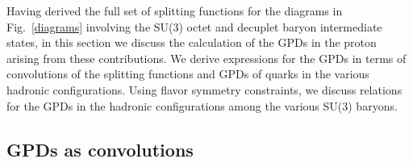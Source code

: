 \documentclass[preprintnumbers,prd,superscriptaddress,preprint]{revtex4-1}
\begin{document}
Having derived the full set of splitting functions for the diagrams in Fig.~\ref{diagrams} involving the SU(3) octet and decuplet baryon intermediate states, in this section we discuss the calculation of the GPDs in the proton arising from these contributions.
We derive expressions for the GPDs in terms of convolutions of the splitting functions and GPDs of quarks in the various hadronic configurations.
Using flavor symmetry constraints, we discuss relations for the GPDs in the hadronic configurations among the various SU(3) baryons.


\subsection{GPDs as convolutions}
\label{ssec.gpdconv}
\end{document}
